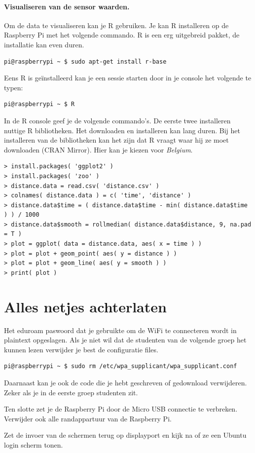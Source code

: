 \documentclass[a4paper]{article}
\begin{document}
  
  \paragraph{Visualiseren van de sensor waarden.}  Om de data te
visualiseren kan je R gebruiken.  Je kan R installeren op de Raspberry
Pi met het volgende commando.  R is een erg uitgebreid pakket, de
installatie kan even duren.
\begin{lstlisting}
pi@raspberrypi ~ $ sudo apt-get install r-base
\end{lstlisting}

  Eens R is ge\"installeerd kan je een sessie starten door in je
console het volgende te typen:
\begin{lstlisting}
pi@raspberrypi ~ $ R
\end{lstlisting}

  In de R console geef je de volgende commando's.  De eerste twee
installeren nuttige R bibliotheken.  Het downloaden en installeren kan
lang duren.  Bij het installeren van de bibliotheken kan het zijn dat
R vraagt waar hij ze moet downloaden (CRAN Mirror).  Hier kan je
kiezen voor \emph{Belgium}.
\begin{lstlisting}
> install.packages( 'ggplot2' )
> install.packages( 'zoo' )
> distance.data = read.csv( 'distance.csv' )
> colnames( distance.data ) = c( 'time', 'distance' )
> distance.data$time = ( distance.data$time - min( distance.data$time ) ) / 1000
> distance.data$smooth = rollmedian( distance.data$distance, 9, na.pad = T )
> plot = ggplot( data = distance.data, aes( x = time ) )
> plot = plot + geom_point( aes( y = distance ) )
> plot = plot + geom_line( aes( y = smooth ) )
> print( plot )
\end{lstlisting}

\section{Alles netjes achterlaten}\label{sec:opruimen}

Het eduroam paswoord dat je gebruikte om de WiFi te connecteren wordt
in plaintext opgeslagen.  Als je niet wil dat de studenten van de
volgende groep het kunnen lezen verwijder je best de configuratie
files.

\begin{lstlisting}
pi@raspberrypi ~ $ sudo rm /etc/wpa_supplicant/wpa_supplicant.conf
\end{lstlisting}

Daarnaast kan je ook de code die je hebt geschreven of gedownload
verwijderen.  Zeker als je in de eerste groep studenten zit.

Ten slotte zet je de Raspberry Pi door de Micro USB connectie te
verbreken.  Verwijder ook alle randappartuur van de Raspberry Pi.

Zet de invoer van de schermen terug op displayport en kijk na of ze
een Ubuntu login scherm tonen.
\end{document}
